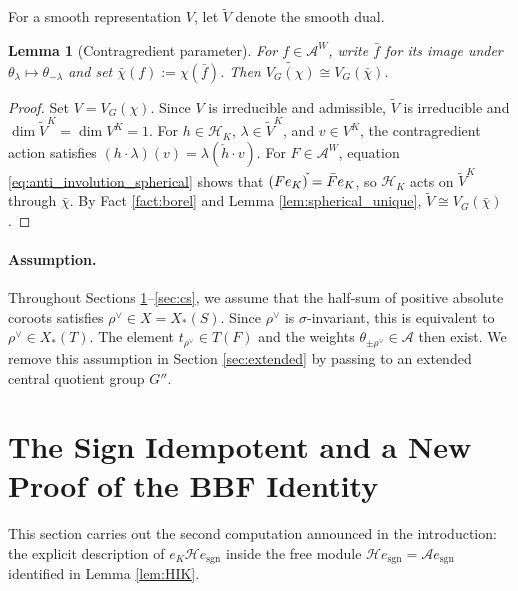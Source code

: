 \documentclass[12pt]{article}
\numberwithin{equation}{section}
\newtheorem{lemma}[theorem]{Lemma}
\theoremstyle{definition}
\theoremstyle{remark}
\theoremstyle{plain}
\begin{document}
For a smooth representation $V$, let $\widetilde{V}$ denote the smooth dual.

\begin{lemma}[Contragredient parameter]\label{lem:contragredient}
For $f \in \mathcal{A}^W$, write $\bar{f}$ for its image under $\theta_\lambda \mapsto \theta_{-\lambda}$ and set $\bar{\chi}(f) := \chi(\bar{f})$. Then $\widetilde{V_G(\chi)} \cong V_G(\bar{\chi})$.
\end{lemma}
\begin{proof}
Set $V = V_G(\chi)$. Since $V$ is irreducible and admissible, $\widetilde{V}$ is irreducible and $\dim \widetilde{V}^K = \dim V^K = 1$. For $h \in \mathcal{H}_K$, $\lambda \in \widetilde{V}^K$, and $v \in V^K$, the contragredient action satisfies $(h\cdot\lambda)(v) = \lambda(\check{h}\cdot v)$. For $F \in \mathcal{A}^W$, equation \eqref{eq:anti_involution_spherical} shows that $(Fe_K)\check{\vphantom{f}} = \bar{F}e_K$, so $\mathcal{H}_K$ acts on $\widetilde{V}^K$ through $\bar{\chi}$. By Fact \ref{fact:borel} and Lemma \ref{lem:spherical_unique}, $\widetilde{V} \cong V_G(\bar{\chi})$.
\end{proof}

\paragraph{Assumption.} Throughout Sections \ref{sec:bbf}--\ref{sec:cs}, we assume that the half-sum of positive absolute coroots satisfies $\rho^\vee \in X = X_*(S)$. Since $\rho^\vee$ is $\sigma$-invariant, this is equivalent to $\rho^\vee \in X_*(T)$. The element $t_{\rho^\vee} \in T(F)$ and the weights $\theta_{\pm\rho^\vee} \in \mathcal{A}$ then exist. We remove this assumption in Section \ref{sec:extended} by passing to an extended central quotient group $G''$.

\section[The Sign Idempotent and a New Proof of the BBF Identity]{\fontsize{15}{18}\selectfont The Sign Idempotent and a New Proof of the BBF Identity}\label{sec:bbf}
This section carries out the second computation announced in the introduction: the explicit description of $e_K\mathcal{H}e_{\mathrm{sgn}}$ inside the free module $\mathcal{H}e_{\mathrm{sgn}} = \mathcal{A}e_{\mathrm{sgn}}$ identified in Lemma \ref{lem:HIK}.
\end{document}
